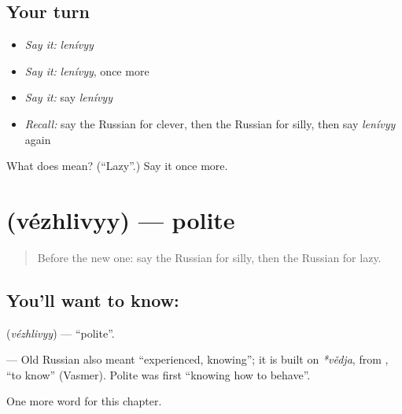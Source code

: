 \subsection*{Your turn}
\begin{itemize}
\raggedright
  \item \emph{Say it:} \emph{lenívyy}
  \item \emph{Say it:} \emph{lenívyy}, once more
  \item \emph{Say it:} say \emph{lenívyy}
  \item \emph{Recall:} say the Russian for clever, then the Russian for silly, then say \emph{lenívyy} again
\end{itemize}

\begin{tcolorbox}[breakable,colback=teal!4,colframe=teal!35!black,title={Before you move on}]
What does  mean? (\textquotedblleft{}Lazy\textquotedblright{}.) Say it once more.
\end{tcolorbox}
\section[\texorpdfstring{\ru{вежливый} (vézhlivyy)}{вежливый (vézhlivyy)}]{ (vézhlivyy) — polite}

\label{lesson:RU-C155-vezhlivyy}



\begin{quote}
Before the new one: say the Russian for silly, then the Russian for lazy.
\end{quote}

\subsection*{You'll want to know: }
\textbf{} (\emph{vézhlivyy}) — \textquotedblleft{}polite\textquotedblright{}.

\begin{cousinweb}
\textbf{} — Old Russian \emph{} also meant \textquotedblleft{}experienced, knowing\textquotedblright{}; it is built on \emph{*vědja}, from \emph{}, \textquotedblleft{}to know\textquotedblright{} (Vasmer). Polite was first \textquotedblleft{}knowing how to behave\textquotedblright{}.
\end{cousinweb}

\begin{grammarlens}[title={What you've built}]
One more word for this chapter.
\end{grammarlens}

